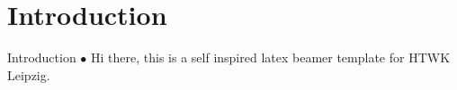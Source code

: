 \section[Intro]{Introduction}
\begin{frame}{Introduction}
$\bullet$ Hi there, this is a self inspired latex beamer template for HTWK Leipzig. 
\end{frame}